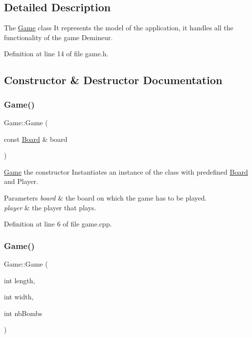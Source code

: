 \subsection{Detailed Description}
The \hyperlink{class_game}{Game} class It represents the model of the application, it handles all the functionality of the game Demineur. 

Definition at line 14 of file game.\+h.



\subsection{Constructor \& Destructor Documentation}
\mbox{\label{class_game_a4db83a8aaf9743aa8f15d6e3c03d9e40}} 
\subsubsection{\texorpdfstring{Game()}{Game()}\hspace{0.1cm}{\footnotesize\ttfamily [1/2]}}
{\footnotesize\ttfamily Game\+::\+Game (\begin{DoxyParamCaption}\item[{const \hyperlink{class_board}{Board} \&}]{board }\end{DoxyParamCaption})}



\hyperlink{class_game}{Game} the constructor Instantiates an instance of the class with predefined \hyperlink{class_board}{Board} and Player. 


\begin{DoxyParams}{Parameters}
{\em board} & the board on which the game has to be played. \\
\hline
{\em player} & the player that plays. \\
\hline
\end{DoxyParams}


Definition at line 6 of file game.\+cpp.

\mbox{\label{class_game_ae130acf9aed6f46c32802fb6da8187b1}} 
\subsubsection{\texorpdfstring{Game()}{Game()}\hspace{0.1cm}{\footnotesize\ttfamily [2/2]}}
{\footnotesize\ttfamily Game\+::\+Game (\begin{DoxyParamCaption}\item[{int}]{length,  }\item[{int}]{width,  }\item[{int}]{nb\+Bombs }\end{DoxyParamCaption})}



